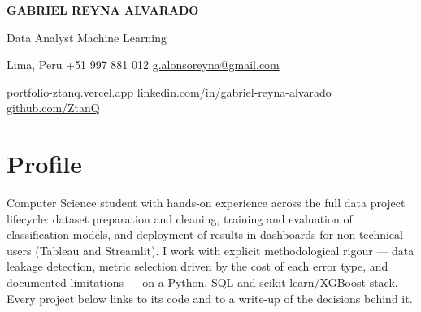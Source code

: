 \documentclass[10pt,letterpaper]{article}
\newcommand{\urlref}[2]{\href{#1}{#2}}
\begin{document}

\begin{center}

    {\fontsize{20}{22}\selectfont\bfseries GABRIEL REYNA ALVARADO}

    \vspace{0.35ex}

    {\large\color{accent}
    Data Analyst \textbar{} Machine Learning
    }

    \vspace{0.65ex}

    {\small
    Lima, Peru
    \textbar{}
    +51 997 881 012
    \textbar{}
    \href{mailto:g.alonsoreyna@gmail.com}{g.alonsoreyna@gmail.com}
    }

    \vspace{0.3ex}

    {\small
    \urlref{https://portfolio-ztanq.vercel.app}{portfolio-ztanq.vercel.app}
    \textbar{}
    \urlref{https://linkedin.com/in/gabriel-reyna-alvarado}{linkedin.com/in/gabriel-reyna-alvarado}
    \textbar{}
    \urlref{https://github.com/ZtanQ}{github.com/ZtanQ}
    }

\end{center}

\vspace{0.35ex}


\section{Profile}

Computer Science student with hands-on experience across the full data project
lifecycle: dataset preparation and cleaning, training and evaluation of
classification models, and deployment of results in dashboards for
non-technical users (Tableau and Streamlit). I work with explicit
methodological rigour --- data leakage detection, metric selection driven by
the cost of each error type, and documented limitations --- on a Python,
SQL and scikit-learn/XGBoost stack. Every project below links to its code and
to a write-up of the decisions behind it.

\end{document}
